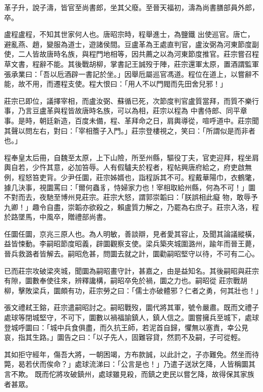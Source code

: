 \begin{pinyinscope}
 革子升，說子濤，皆官至尚書郎，坐其父廢。至晉天福初，濤為尚書膳部員外郎，卒。



 盧程盧程，不知其世家何人也。唐昭宗時，程舉進士，為鹽鐵
 出使巡官。唐亡，避亂燕、趙，變服為道士，遊諸侯間。豆盧革為王處直判官，盧汝弼為河東節度副使，二人皆故唐時名族，與程門地相等，因共薦之以為河東節度推官。莊宗嘗召程草文書，程辭不能。其後戰胡柳，掌書記王誠歿于陣，莊宗還軍太原，置酒謂監軍張承業曰：「吾以卮酒辟一書記於坐。」因舉卮屬巡官馮道。程位在道上，以嘗辭不能，故不用，而遷程支使。程大恨曰：「用人不以門閥而先田舍兒邪！」



 莊宗已即位，議擇宰相，而盧汝弼、蘇循已死，次節度判官盧質當拜，而質不樂行事，乃言豆盧革與程皆故唐時名族，可以為相，莊宗以程為
 中書侍郎、同平章事。是時，朝廷新造，百度未備，程、革拜命之日，肩輿導從，喧呼道中。莊宗聞其聲以問左右，對曰：「宰相簷子入門。」莊宗登樓視之，笑曰：「所謂似是而非者也。」



 程奉皇太后冊，自魏至太原，上下山險，所至州縣，驅役丁夫，官吏迎拜，程坐肩輿自若，少忤其意，必加笞辱。人有假驢夫於程者，程帖興唐府給之，府吏啟無例，程怒笞吏背。少尹任圜，莊宗姊婿也，詣程訴其不可。程戴華陽巾，衣鶴氅，據几決事，視圜罵曰：「爾何蟲豸，恃婦家力也！宰相取給州縣，何為不可！」圜不對而去，夜馳至博州見莊宗。莊宗大怒，謂郭崇韜曰：「朕誤相此癡
 物，敢辱予九卿！」趣令自盡，崇韜亦欲殺之，賴盧質力解之，乃罷為右庶子。莊宗入洛，程於路墜馬，中風卒，贈禮部尚書。



 任圜任圜，京兆三原人也。為人明敏，善談辯，見者愛其容止，及聞其論議縱橫，益皆悚動。李嗣昭節度昭義，辟圜觀察支使。梁兵築夾城圍潞州，踰年而晉王薨，晉兵救潞者皆解去。嗣昭危甚，問圜去就之計，圜勸嗣昭堅守以待，不可有二心。



 已而莊宗攻破梁夾城，聞圜為嗣昭畫守計，甚嘉之，由是益知名。其後嗣昭與莊宗有隙，圜數奉使往來，辨釋讒構，嗣昭卒免於禍，圜之力也。嗣昭從
 莊宗戰胡柳，擊敗梁兵，圜頗有功，莊宗勞之曰：「儒士亦破體邪？仁者之勇，何其壯也！」



 張文禮弒王鎔，莊宗遣嗣昭討之。嗣昭戰歿，圜代將其軍，號令嚴肅。既而文禮子處球等閉城堅守，不可下，圜數以禍福諭鎮人，鎮人信之。圜嘗擁兵至城下，處球登城呼圜曰：「城中兵食俱盡，而久抗王師，若泥首自歸，懼無以塞責，幸公見哀，指其生路。」圜告之曰：「以子先人，固難容貸，然罰不及嗣，子可從輕。



 其如拒守經年，傷吾大將，一朝困竭，方布款誠，以此計之，子亦難免。然坐而待斃，曷若伏而俟命？」處球流涕曰：「公言是也！」乃遣子送狀乞降，人皆稱圜其言不欺。
 既而佗將攻破鎮州，處球雖見殺，而鎮之吏民以嘗乞降，故得保其家族者甚眾。




\end{pinyinscope}
